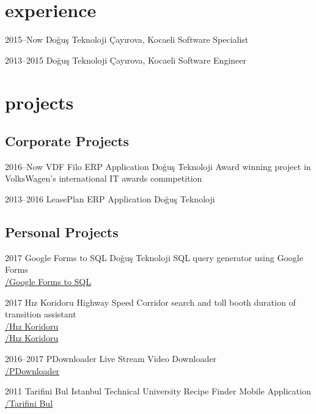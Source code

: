 \documentclass[]{../friggeri-cv} %
\begin{document}
\section{experience}

\begin{entrylist}

\entry
{2015--Now}
{Doğuş Teknoloji}
{Çayırova, Kocaeli}
{Software Specialist}

\entry
{2013--2015}
{Doğuş Teknoloji}
{Çayırova, Kocaeli}
{Software Engineer}

\end{entrylist}

\section{projects}

\subsection{Corporate Projects}

\begin{entrylist}

\entry
{2016--Now}
{VDF Filo ERP Application}
{Doğuş Teknoloji}
{Award winning project in VolksWagen's international IT awards commpetition}

\entry
{2013--2016}
{LeasePlan ERP Application}
{Doğuş Teknoloji}
{}

\end{entrylist}

\subsection{Personal Projects}

\begin{entrylist}

\entry
{2017}
{Google Forms to SQL}
{Doğuş Teknoloji}
{SQL query generator using Google Forms
\\\href{https://github.com/suphero/Google-Forms-to-SQL}{\faGithub/Google Forms to SQL}}

\entry
{2017}
{Hız Koridoru}
{}
{Highway Speed Corridor search and toll booth duration of transition assistant
\\\href{https://play.google.com/store/apps/details?id=com.harunsokullu.speedcorridor}{\faAndroid/Hız Koridoru}
\\\href{https://itunes.apple.com/tr/app/h\%C4\%B1z-koridoru/id1265151812}{\faApple/Hız Koridoru}}

\entry
{2016--2017}
{PDownloader}
{}
{Live Stream Video Downloader
\\\href{https://github.com/suphero/PDownloader}{\faGithub/PDownloader}}

\entry
{2011}
{Tarifini Bul}
{Istanbul Technical University}
{Recipe Finder Mobile Application
\\\href{https://play.google.com/store/apps/details?id=com.tarifinibul}{\faAndroid/Tarifini Bul}}

\end{entrylist}

\footer
\end{document}
